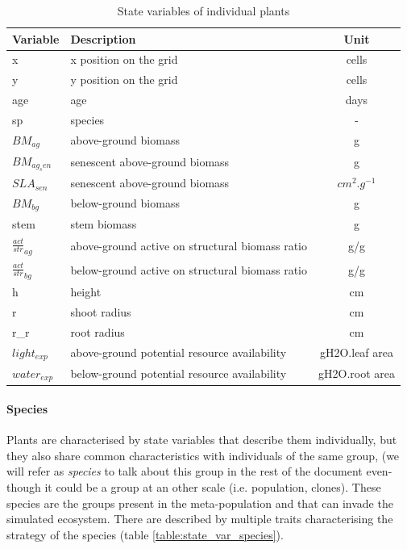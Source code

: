 \documentclass[a4paper,twoside, justified,marginals=raggedright, nobib]{tufte-handout}
\begin{document}
\begin{table}
\caption{State variables of individual plants} 
\label{table:state_var_plant}
\begin{tabular}{l|l|c}
Variable & Description & Unit \\ 
\hline 
x & x position on the grid & cells \\
y & y position on the grid & cells \\
age & age & days \\
sp & species & - \\
$BM_{ag}$ & above-ground biomass & g \\
$BM_{ag_sen}$ & senescent above-ground biomass & g \\
$SLA_{sen}$ & senescent above-ground biomass & $cm^{2}.g^{-1}$ \\
$BM_{bg}$ & below-ground biomass & g \\
stem & stem biomass & g \\
$\frac{act}{str}_{ag}$ & above-ground active on structural biomass ratio & g/g \\
$\frac{act}{str}_{bg}$ & below-ground active on structural biomass ratio & g/g \\
h & height & cm \\
r & shoot radius & cm \\
r\_r & root radius & cm \\ 
$light_{exp}$ & above-ground potential resource availability & gH2O.leaf area\\
$water_{exp}$ & below-ground potential resource availability & gH2O.root area\\
\end{tabular} 
\vspace*{0.5cm}
\end{table}


\paragraph{Species} Plants are characterised by state variables that describe them individually, but they also share common characteristics with individuals of the same group, (we will refer as \textit{species} to talk about this group in the rest of the document even-though it could be a group at an other scale (i.e. population, clones). These species are the groups present in the meta-population and that can invade the simulated ecosystem. There are described by multiple traits characterising the strategy of the species (table \ref{table:state_var_species}).
\end{document}
